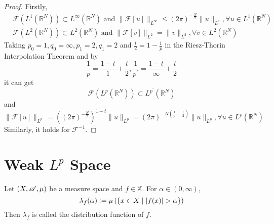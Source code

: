 \begin{proof}
	Firstly,
	$$
	\begin{aligned}
	& \mathcal{F}\left(L^1\left(\mathbb{R}^N\right)\right) \subset L^{\infty}\left(\mathbb{R}^N\right) \text { and }\|\mathcal{F}[u]\|_{L^{\infty}} \leqslant(2 \pi)^{-\frac{N}{2}}\|u\|_{L^1}, \forall u \in L^1\left(\mathbb{R}^N\right) \\
	& \mathcal{F}\left(L^2\left(\mathbb{R}^N\right)\right) \subset L^2\left(\mathbb{R}^N\right) \text { and }\|\mathcal{F}[v]\|_{L^2}=\|v\|_{L^2}, \forall v \in L^2\left(\mathbb{R}^N\right)
	\end{aligned}
	$$
	Taking $p_0=1, q_0=\infty, p_1=2, q_1=2$ and $\frac{t}{2}=1-\frac{1}{p}$ in the Riesz-Thorin Interpolation Theorem and by
	$$
	\frac{1}{p}=\frac{1-t}{1}+\frac{t}{2}, \frac{1}{p^{\prime}}=\frac{1-t}{\infty}+\frac{t}{2}
	$$
	it can get
	$$
	\mathcal{F}\left(L^p\left(\mathbb{R}^N\right)\right) \subset L^{p^{\prime}}\left(\mathbb{R}^N\right)
	$$
	and
	$$
	\|\mathcal{F}[u]\|_{L^{p^{\prime}}}=\left((2 \pi)^{-\frac{N}{2}}\right)^{1-t}\|u\|_{L^p}=(2 \pi)^{-N\left(\frac{1}{p}-\frac{1}{2}\right)}\|u\|_{L^p}, \forall u \in L^p\left(\mathbb{R}^N\right)
	$$
	Similarly, it holds for $\mathcal{F}^{-1}$.
\end{proof}


\section{Weak \texorpdfstring{$L^p$}{Lp} Space}

\begin{defn}
	Let $(X,\mathscr{A},\mu)$ be a measure space and $f \in \mathbb{X}$. For $\alpha \in (0,\infty)$,
	\begin{equation*}
		\lambda_f(\alpha) \vcentcolon= \mu\left(\left\{x \in X \mid \left\lvert f(x)\right\lvert > \alpha\right\}\right)
	\end{equation*}
	Then $\lambda_f$ is called the distribution function of $f$.
\end{defn}

